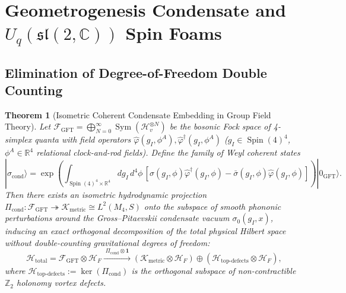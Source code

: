\documentclass[11pt,a4paper]{article}
\theoremstyle{plain}
\newtheorem{theorem}{Theorem}[section]
\theoremstyle{definition}
\theoremstyle{remark}
\newcommand{\Sym}{\operatorname{Sym}}
\newcommand{\Spin}{\operatorname{Spin}}
\newcommand{\K}{\mathcal{K}}
\newcommand{\Hilb}{\mathcal{H}}
\newcommand{\F}{\mathcal{F}}
\newcommand{\R}{\mathbb{R}}
\newcommand{\Z}{\mathbb{Z}}
\begin{document}
\section{Geometrogenesis Condensate and $U_q(\mathfrak{sl}(2,\mathbb{C}))$ Spin Foams}
\label{sec:geometrogenesis}

\subsection{Elimination of Degree-of-Freedom Double Counting}

\begin{theorem}[Isometric Coherent Condensate Embedding in Group Field Theory]
\label{thm:gft_embedding}
Let $\F_{\mathrm{GFT}} = \bigoplus_{N=0}^\infty \Sym(\Hilb_v^{\otimes N})$ be the bosonic Fock space of 4-simplex quanta with field operators $\hat{\varphi}(g_I, \phi^A), \hat{\varphi}^\dagger(g_I, \phi^A)$ ($g_I \in \Spin(4)^4$, $\phi^A \in \R^4$ relational clock-and-rod fields). Define the family of Weyl coherent states
\begin{equation}
  |\sigma_{\mathrm{cond}}\rangle = \exp\left( \int_{\Spin(4)^4 \times \R^4} dg_I \, d^4\phi \, \left[ \sigma(g_I, \phi) \hat{\varphi}^\dagger(g_I, \phi) - \bar{\sigma}(g_I, \phi) \hat{\varphi}(g_I, \phi) \right] \right) |0_{\mathrm{GFT}}\rangle.
\end{equation}
Then there exists an isometric hydrodynamic projection $\Pi_{\mathrm{cond}}: \F_{\mathrm{GFT}} \twoheadrightarrow \K_{\mathrm{metric}} \cong L^2(M_4, S)$ onto the subspace of smooth phononic perturbations around the Gross--Pitaevskii condensate vacuum $\sigma_0(g_I, x)$, inducing an exact orthogonal decomposition of the total physical Hilbert space without double-counting gravitational degrees of freedom:
\begin{equation}
  \label{eq:hilbert_decomp}
  \Hilb_{\mathrm{total}} = \F_{\mathrm{GFT}} \otimes \Hilb_F \xrightarrow{\;\Pi_{\mathrm{cond}} \otimes \mathbf{1}\;} \left( \K_{\mathrm{metric}} \otimes \Hilb_F \right) \oplus \left( \Hilb_{\mathrm{top\text{-}defects}} \otimes \Hilb_F \right),
\end{equation}
where $\Hilb_{\mathrm{top\text{-}defects}} := \ker(\Pi_{\mathrm{cond}})$ is the orthogonal subspace of non-contractible $\Z_2$ holonomy vortex defects.
\end{theorem}
\end{document}
